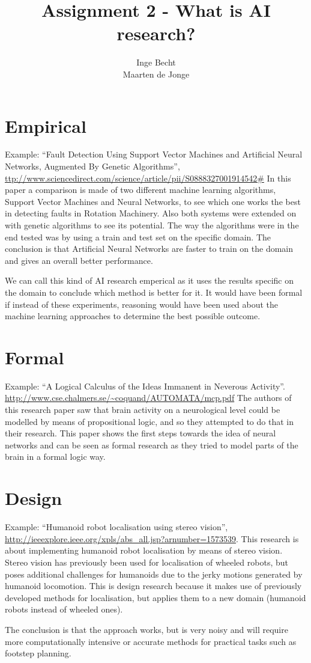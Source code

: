 \documentclass[a4paper, 12pt]{article}
\author{Inge Becht \\ Maarten de Jonge}
\title{Assignment 2 - What is AI research?}
\begin{document}
\maketitle

\section{Empirical}
Example: ``Fault Detection Using Support Vector Machines and Artificial Neural
Networks, Augmented By Genetic Algorithms'',
\url{ttp://www.sciencedirect.com/science/article/pii/S0888327001914542#}
In this paper a comparison is made of two different machine learning algorithms,
Support Vector Machines and Neural Networks, to see which one works the best in
detecting faults in Rotation Machinery. Also both systems were extended on with genetic algorithms to
see its potential. The way the algorithms were in the end tested was by using a
train and test set on the specific domain. The conclusion is that Artificial
Neural Networks are faster to train on the domain and gives an overall better
performance. 

We can call this kind of AI research emperical as it uses the results specific
on the domain to conclude which method is better for it. It would have been
formal if instead of these experiments, reasoning would have been used about the
machine learning approaches to determine the best possible outcome.


\section{Formal}
Example: ``A Logical Calculus of the Ideas Immanent in Neverous Activity''.
\url{http://www.cse.chalmers.se/~coquand/AUTOMATA/mcp.pdf}
The authors of this research paper saw that brain activity on a neurological
level could be modelled by means of propositional logic, and so they attempted
to do that in their research. This paper shows the first
steps towards the idea of neural networks and can be seen as formal research as
they tried to model parts of the brain in a formal logic way.

\section{Design}
Example: ``Humanoid robot localisation using stereo vision'',
\url{http://ieeexplore.ieee.org/xpls/abs\_all.jsp?arnumber=1573539}.
This research is about implementing humanoid robot localisation by means of
stereo vision. Stereo vision has previously been used for localisation of
wheeled robots, but poses additional challenges for humanoids due to the jerky
motions generated by humanoid locomotion.
This is design research because it makes use of previously developed methods for
localisation, but applies them to a new domain (humanoid robots instead of
wheeled ones).

The conclusion is that the approach works, but is very noisy and will require
more computationally intensive or accurate methods for practical tasks such as
footstep planning.
	
\end{document}
